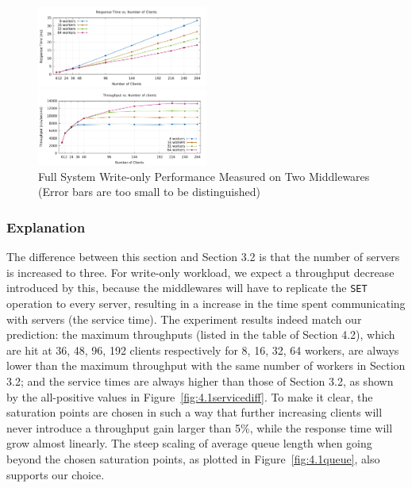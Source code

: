 \begin{figure}[!h]
\parbox{.5\linewidth}{
\centering
\includegraphics[width=0.5\textwidth]{img/4_responsetime_mw.png}
}
\parbox{.5\linewidth}{
\centering
\includegraphics[width=0.5\textwidth]{img/4_throughput_mw.png}
}
\captionsetup{justification=centering}
\caption{\label{fig:4.1performance}Full System Write-only Performance Measured on Two Middlewares \\(Error bars are too small to be distinguished)}
\end{figure}

\subsubsection{Explanation}

The difference between this section and Section 3.2 is that the number of servers is increased to three. For write-only workload, we expect a throughput decrease introduced by this, because the middlewares will have to replicate the \texttt{SET} operation to every server, resulting in a increase in the time spent communicating with servers (the service time). The experiment results indeed match our prediction: the maximum throughputs (listed in the table of Section 4.2), which are hit at 36, 48, 96, 192 clients respectively for 8, 16, 32, 64 workers, are always lower than the maximum throughput with the same number of workers in Section 3.2; and the service times are always higher than those of Section 3.2, as shown by the all-positive values in Figure~\ref{fig:4.1servicediff}. To make it clear, the saturation points are chosen in such a way that further increasing clients will never introduce a throughput gain larger than 5\%, while the response time will grow almost linearly. The steep scaling of average queue length when going beyond the chosen saturation points, as plotted in Figure~\ref{fig:4.1queue}, also supports our choice.



